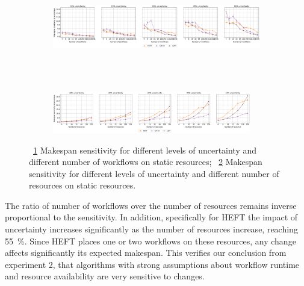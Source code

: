 \begin{figure}[ht!]
    \centering
    \begin{subfigure}[b]{0.85\textwidth}
        \includegraphics[width=.95\textwidth]{figures/campaign/InaccurStHeteroCampaigns_4StHeteroResourcesSens.pdf}
        \caption{}
        \label{fig:InaccurStHeteroCampaigns_4StHeteroResourcesSens}
    \end{subfigure}\\
    ~ 
    \begin{subfigure}[b]{0.85\textwidth}
        \includegraphics[width=0.95\textwidth]{figures/campaign/InaccurStHeteroResources_StHeteroCampaignsSens.pdf}
        \caption{}
        \label{fig:InaccurStHeteroResources_StHeteroCampaignsSens}
    \end{subfigure}
    \caption{~\ref{fig:InaccurStHeteroCampaigns_4StHeteroResourcesSens} Makespan sensitivity for different levels of uncertainty and different number of workflows on static resources;
    ~\ref{fig:InaccurStHeteroResources_StHeteroCampaignsSens} Makespan sensitivity for different levels of uncertainty and different number of resources on static resources.}
    \label{fig:inaccur_st}
\end{figure}

The ratio of number of workflows over the number of resources remains inverse proportional to the sensitivity.
In addition, specifically for HEFT the impact of uncertainty increases significantly as the number of resources increase, reaching 55~\%.
Since HEFT places one or two workflows on these resources, any change affects significantly its expected makespan.
This verifies our conclusion from experiment 2, that algorithms with strong assumptions about workflow runtime and resource availability are very sensitive to changes.

